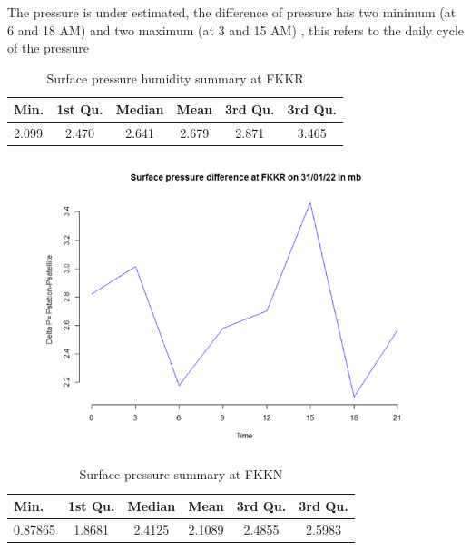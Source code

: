 The pressure is under estimated, the difference of pressure has two minimum (at 6 and 18 AM) and two maximum (at 3 and 15 AM) ,
this refers to the daily cycle of the pressure
\newpage
\begin{table}[H]
\caption{Surface pressure humidity summary at FKKR}
\label{tab:Surface pressure  summary at FKKR}
\begin{center}
\begin{tabular}{| l | c | c |c |c |c |}
\hline
\textbf{\small{Min.}} & \textbf{\small{1st Qu.}} & \textbf{\small{Median}}& \textbf{\small{Mean}} & \textbf{\small{3rd Qu.}} & \textbf{\small{3rd Qu.}}\\[2pt] \hline

\small{2.099}& \small{2.470} & \small{2.641}& \small{2.679} &  \small{2.871}& \small{3.465} \\ \hline
\end{tabular}
\end{center}
\end{table}

\begin{figure}[H]
\begin{center}
\includegraphics[scale=0.6]{a3.png} %
\end{center}
\end{figure}
 

\begin{table}[H]
\caption{Surface pressure  summary at FKKN}
\label{tab:Surface pressure summary at FKKN}
\begin{center}
\begin{tabular}{| l | c | c |c |c |c |}
\hline
\textbf{\small{Min.}} & \textbf{\small{1st Qu.}} & \textbf{\small{Median}}& \textbf{\small{Mean}} & \textbf{\small{3rd Qu.}} & \textbf{\small{3rd Qu.}}\\[2pt] \hline

\small{0.87865}& \small{1.8681}& \small{2.4125} & \small{2.1089} & \small{2.4855}  &\small{2.5983}\\ \hline
\end{tabular}
\end{center}
\end{table}


